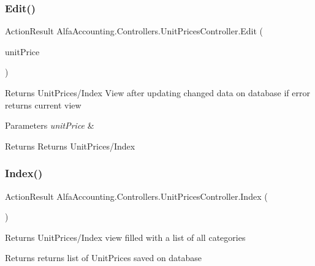 \subsubsection{\texorpdfstring{Edit()}{Edit()}\hspace{0.1cm}{\footnotesize\ttfamily [2/2]}}
{\footnotesize\ttfamily Action\+Result Alfa\+Accounting.\+Controllers.\+Unit\+Prices\+Controller.\+Edit (\begin{DoxyParamCaption}\item[{\mbox{[}\+Bind(\+Include = \char`\"{}\+Unit\+Price\+Id,\+Unit\+Price\+Value,\+Unit\+Price\+Description\char`\"{})\mbox{]} Unit\+Price}]{unit\+Price }\end{DoxyParamCaption})}



Returns Unit\+Prices/\+Index View after updating changed data on database if error returns current view 


\begin{DoxyParams}{Parameters}
{\em unit\+Price} & \\
\hline
\end{DoxyParams}
\begin{DoxyReturn}{Returns}
Returns Unit\+Prices/\+Index
\end{DoxyReturn}
\mbox{\label{class_alfa_accounting_1_1_controllers_1_1_unit_prices_controller_ab1aa5af63ac3b67b987e0fd50ebeee05}} 
\subsubsection{\texorpdfstring{Index()}{Index()}\hspace{0.1cm}{\footnotesize\ttfamily [1/2]}}
{\footnotesize\ttfamily Action\+Result Alfa\+Accounting.\+Controllers.\+Unit\+Prices\+Controller.\+Index (\begin{DoxyParamCaption}{ }\end{DoxyParamCaption})}



Returns Unit\+Prices/\+Index view filled with a list of all categories 

\begin{DoxyReturn}{Returns}
returns list of Unit\+Prices saved on database 
\end{DoxyReturn}
\mbox{\label{class_alfa_accounting_1_1_controllers_1_1_unit_prices_controller_a4e1be84e28e21a170e5e0fda5f4a63d2}} 
